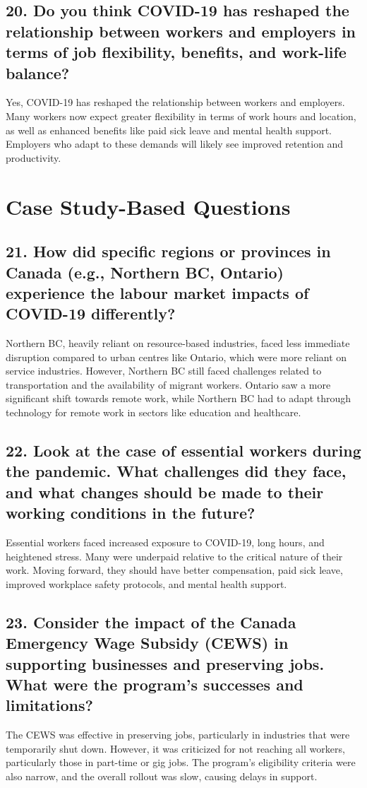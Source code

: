\documentclass[12pt]{article}
\begin{document}
\subsection*{20. Do you think COVID-19 has reshaped the relationship between workers and employers in terms of job flexibility, benefits, and work-life balance?}
Yes, COVID-19 has reshaped the relationship between workers and employers. Many workers now expect greater flexibility in terms of work hours and location, as well as enhanced benefits like paid sick leave and mental health support. Employers who adapt to these demands will likely see improved retention and productivity.

\section*{Case Study-Based Questions}

\subsection*{21. How did specific regions or provinces in Canada (e.g., Northern BC, Ontario) experience the labour market impacts of COVID-19 differently?}
Northern BC, heavily reliant on resource-based industries, faced less immediate disruption compared to urban centres like Ontario, which were more reliant on service industries. However, Northern BC still faced challenges related to transportation and the availability of migrant workers. Ontario saw a more significant shift towards remote work, while Northern BC had to adapt through technology for remote work in sectors like education and healthcare.

\subsection*{22. Look at the case of essential workers during the pandemic. What challenges did they face, and what changes should be made to their working conditions in the future?}
Essential workers faced increased exposure to COVID-19, long hours, and heightened stress. Many were underpaid relative to the critical nature of their work. Moving forward, they should have better compensation, paid sick leave, improved workplace safety protocols, and mental health support.

\subsection*{23. Consider the impact of the Canada Emergency Wage Subsidy (CEWS) in supporting businesses and preserving jobs. What were the program’s successes and limitations?}
The CEWS was effective in preserving jobs, particularly in industries that were temporarily shut down. However, it was criticized for not reaching all workers, particularly those in part-time or gig jobs. The program’s eligibility criteria were also narrow, and the overall rollout was slow, causing delays in support.
\end{document}
